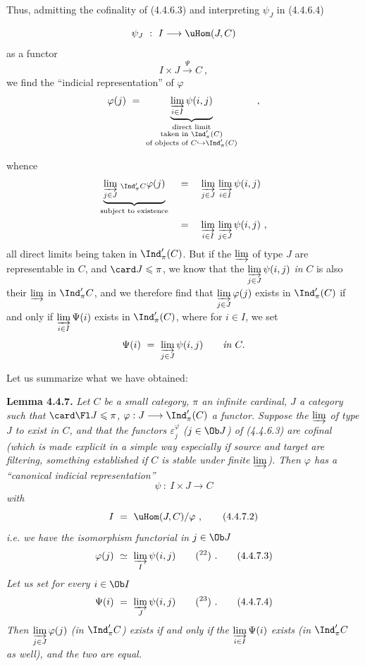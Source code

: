 Thus, admitting the cofinality of (4.4.6.3) and interpreting $\psi_J$ in (4.4.6.4)

\[
\psi_J \ :\ I \longrightarrow \uHom(J,C)
\]
as a functor
\[
I \times J \xrightarrow{\Psi} C\ , %
\]
we find the ``indicial representation'' of $\varphi$
\[
\varphi(j) \ =\ \underbrace{\varinjlim_{i\in I} \psi(i,j)}_{\substack{\text{direct limit}\\ \text{taken in } \Ind'_\pi(C)\\ \text{of objects of } C \hookrightarrow \Ind'_\pi(C)}} \qquad ,
\]

whence
\[
\begin{aligned}
\underbrace{\varinjlim_{j\in J}{}_{\,\Ind'_\pi C}\varphi(j)}_{\text{subject to existence}} \quad &= \quad \varinjlim_{j\in J}\, \varinjlim_{i\in I} \psi(i,j)\\
&= \quad \varinjlim_{i\in I}\, \varinjlim_{j\in J} \psi(i,j)\ ,
\end{aligned}
\]
all direct limits being taken in $\Ind'_\pi(C)$. But if the $\varinjlim$ of type $J$ are representable in $C$, and $\card J \leqslant \pi$, we know that the $\varinjlim\limits_{j\in J} \psi(i,j)$ \textit{in} $C$ is also their $\varinjlim$ in $\Ind'_\pi C$, and we therefore find that $\varinjlim\limits_{j\in J} \varphi(j)$ exists in $\Ind'_\pi(C)$ if and only if $\varinjlim\limits_{i\in I} \Psi(i)$ exists in $\Ind'_\pi(C)$, where for $i \in I$, we set
\[
\Psi(i) \ =\ \varinjlim_{j\in J} \psi(i,j) \qquad \textit{in } C.
\]

Let us summarize what we have obtained:

\textbf{Lemma 4.4.7.} \textit{Let $C$ be a small category, $\pi$ an infinite cardinal, $J$ a category such that $\card \Fl J \leqslant \pi$, $\varphi : J \longrightarrow \Ind'_\pi(C)$ a functor. Suppose the $\varinjlim$ of type $J$ to exist in $C$, and that the functors $\varepsilon_j^\varphi$ ($j \in \Ob J$) of (4.4.6.3) are \textup{cofinal} (which is made explicit in a simple way especially if source and target are filtering, something established if $C$ is stable under finite $\varinjlim$). Then $\varphi$ has a ``canonical indicial representation''}
\[
\psi \ :\ I \times J \longrightarrow C \tag*{(4.4.7.1)}
\]
\textit{with}
\[
I \ =\ \uHom(J,C)/\varphi\ , \tag*{(4.4.7.2)}
\]
\textit{i.e. we have the isomorphism functorial in $j \in \Ob J$}
\[
\varphi(j) \ \simeq\ \varinjlim_{I} \psi(i,j) \qquad (\text{\footnotemark[22]})\ . \tag*{(4.4.7.3)}
\]
\textit{Let us set for every $i \in \Ob I$}
\[
\Psi(i) \ =\ \varinjlim_{J} \psi(i,j) \qquad (\text{\footnotemark[23]})\ . \tag*{(4.4.7.4)}
\]
\textit{Then $\varinjlim\limits_{j\in J} \varphi(j)$ (in $\Ind'_\pi C$) exists if and only if}
\textit{the $\varinjlim\limits_{i\in I} \Psi(i)$ exists (in $\Ind'_\pi C$ as well), and the two are equal.}


